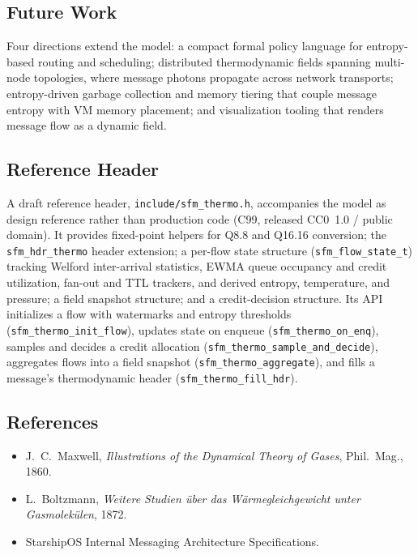 \subsection{Future Work}

Four directions extend the model: a compact formal policy language for entropy-based
routing and scheduling; distributed thermodynamic fields spanning multi-node
topologies, where message photons propagate across network transports; entropy-driven
garbage collection and memory tiering that couple message entropy with VM memory
placement; and visualization tooling that renders message flow as a dynamic field.

\subsection{Reference Header}

A draft reference header, \texttt{include/sfm\_thermo.h}, accompanies the model as
design reference rather than production code (C99, released CC0~1.0 / public domain).
It provides fixed-point helpers for Q8.8 and Q16.16 conversion; the
\texttt{sfm\_hdr\_thermo} header extension; a per-flow state structure
(\texttt{sfm\_flow\_state\_t}) tracking Welford inter-arrival statistics, EWMA queue
occupancy and credit utilization, fan-out and TTL trackers, and derived entropy,
temperature, and pressure; a field snapshot structure; and a credit-decision
structure. Its API initializes a flow with watermarks and entropy thresholds
(\texttt{sfm\_thermo\_init\_flow}), updates state on enqueue
(\texttt{sfm\_thermo\_on\_enq}), samples and decides a credit allocation
(\texttt{sfm\_thermo\_sample\_and\_decide}), aggregates flows into a field snapshot
(\texttt{sfm\_thermo\_aggregate}), and fills a message's thermodynamic header
(\texttt{sfm\_thermo\_fill\_hdr}).


\subsection{References}

\begin{itemize}
  \item J.~C.~Maxwell, \textit{Illustrations of the Dynamical Theory of Gases},
        Phil.~Mag., 1860.
  \item L.~Boltzmann, \textit{Weitere Studien \"uber das W\"armegleichgewicht unter
        Gasmolek\"ulen}, 1872.
  \item StarshipOS Internal Messaging Architecture Specifications.
\end{itemize}
